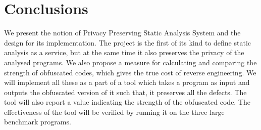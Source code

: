 \documentclass[conference]{IEEEtran}
\begin{document}
\section{Conclusions}
We present the notion of Privacy Preserving Static Analysis System and the design for its implementation. The project is the first of its kind to define static analysis as a service, 
but at the same time it also preserves the privacy of the analysed programs. We also propose a measure for calculating and comparing the strength of obfuscated codes, which gives the 
true cost of reverse engineering. We will implement all these as a part of a tool which takes a program as input and outputs the obfuscated version of it such that, it preserves all 
the defects. The tool will also report a value indicating the strength of the obfuscated code. The effectiveness of the tool will be verified by running it on the three large benchmark 
programs.
{
 
 
}

%
%  
%



\end{document}
